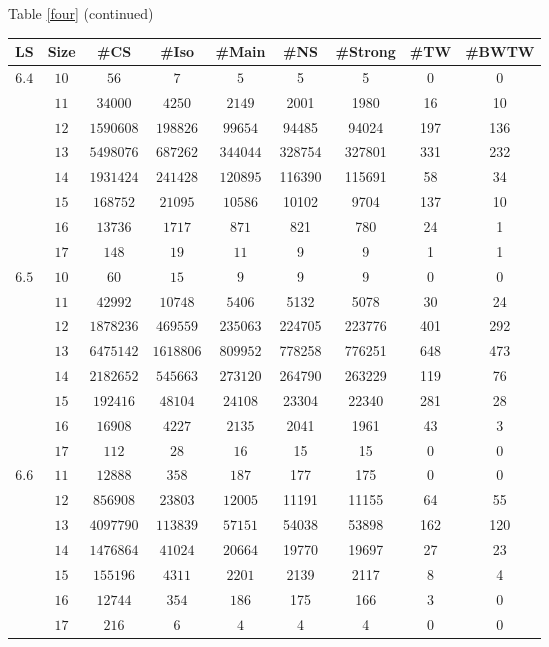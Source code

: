 \newpage
\begin{center}
Table \ref{four} (continued)
\begin{tabular}{|c|c|c|c|c|c|c|c|c|} \hline
 LS & Size & \#CS & \#Iso & \#Main& \#NS & \#Strong & \#TW & \#BWTW \\ \hline
$6.4$ & $10$  & $56$ & $7$  & $5$ & 5 & 5 & 0 & 0 \\
      & $11$  & $34000$ & $4250$  & $2149$ & 2001 & 1980 & 16 & 10 \\
      & $12$  & $1590608$ & $198826$  & $99654$ & 94485 & 94024 & 197 & 136 \\
      & $13$  & $5498076$ & $687262$  & $344044$ & 328754 & 327801 & 331 & 232 \\
      & $14$  & $1931424$ & $241428$  & $120895$ & 116390 & 115691 & 58 & 34 \\
      & $15$  & $168752$ & $21095$  & $10586$ & 10102 & 9704 & 137 & 10 \\
      & $16$  & $13736$ & $1717$  & $871$ & 821 & 780 & 24 & 1 \\
      & $17$  & $148$  & $19$   & $11$ & 9 & 9 & 1 & 1 \\ \hline
$6.5$ & $10$  & $60$ & $15$  & $9$ & 9 & 9 & 0 & 0 \\
      & $11$  & $42992$ & $10748$  & $5406$ & 5132 & 5078 & 30 & 24 \\
      & $12$  & $1878236$ & $469559$  & $235063$ & 224705 & 223776 & 401 & 292 \\
      & $13$  & $6475142$ & $1618806$  & $809952$ & 778258 & 776251 & 648 & 473 \\
      & $14$  & $2182652$ & $545663$  & $273120$ & 264790 & 263229 & 119 & 76 \\
      & $15$  & $192416$ & $48104$  & $24108$ & 23304 & 22340 & 281 & 28 \\
      & $16$  & $16908$ & $4227$  & $2135$ & 2041 & 1961 & 43 & 3 \\
      & $17$  & $112$  & $28$   & $16$ & 15 & 15 & 0 & 0 \\ \hline
$6.6$ & $11$  & $12888$ & $358$  & $187$ & 177 & 175 & 0 & 0 \\
      & $12$  & $856908$ & $23803$  & $12005$ & 11191 & 11155 & 64 & 55 \\
      & $13$  & $4097790$ & $113839$  & $57151$ & 54038 & 53898 & 162 & 120 \\
      & $14$  & $1476864$ & $41024$  & $20664$ & 19770 & 19697 & 27 & 23 \\
      & $15$  & $155196$ & $4311$  & $2201$ & 2139 & 2117 & 8 & 4 \\
      & $16$  & $12744$ & $354$  & $186$ & 175 & 166 & 3 & 0 \\
      & $17$  & $216$  & $6$   & $4$ & 4 & 4 & 0 & 0 \\ \hline
\end{tabular} \vspace{3mm} \\
\end{center}
